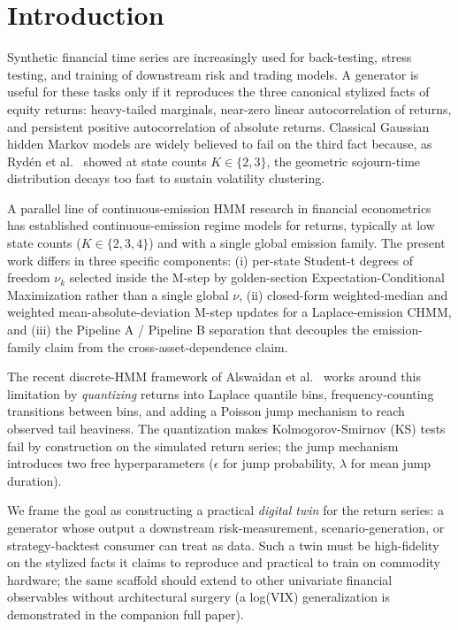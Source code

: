 \documentclass[sigconf,anonymous,nonacm=true]{acmart}
\begin{document}
\section{Introduction}
\label{sec:intro}

Synthetic financial time series are increasingly used for back-testing,
stress testing, and training of downstream risk and trading models. A
generator is useful for these tasks only if it reproduces the three
canonical stylized facts of equity returns: heavy-tailed marginals,
near-zero linear autocorrelation of returns, and persistent positive
autocorrelation of absolute returns. Classical Gaussian hidden Markov
models are widely believed to fail on the third fact because, as
Ryd\'{e}n et al.~\cite{ryden1998stylized} showed at state counts
$K \in \{2, 3\}$, the geometric sojourn-time distribution decays too
fast to sustain volatility clustering.

A parallel line of continuous-emission HMM research in financial
econometrics~\cite{hamilton1989regime, bulla2006stylized,
nystrup2017longmemory} has established continuous-emission regime models
for returns, typically at low state counts ($K \in \{2, 3, 4\}$) and
with a single global emission family. The present work differs in three
specific components: (i) per-state Student-t degrees of freedom
$\nu_k$ selected inside the M-step by golden-section Expectation-Conditional
Maximization rather than a single global $\nu$, (ii) closed-form
weighted-median and weighted mean-absolute-deviation M-step updates for
a Laplace-emission CHMM, and (iii) the Pipeline A / Pipeline B separation
that decouples the emission-family claim from the cross-asset-dependence
claim.

The recent discrete-HMM framework of Alswaidan et
al.~\cite{alswaidan2026hybrid} works around this limitation by
\emph{quantizing} returns into Laplace quantile bins, frequency-counting
transitions between bins, and adding a Poisson jump mechanism to
reach observed tail heaviness. The quantization makes Kolmogorov-Smirnov
(KS) tests fail by construction on the simulated return series; the
jump mechanism introduces two free hyperparameters ($\epsilon$ for
jump probability, $\lambda$ for mean jump duration).

We frame the goal as constructing a practical \emph{digital twin} for
the return series: a generator whose output a downstream
risk-measurement, scenario-generation, or strategy-backtest consumer
can treat as data. Such a twin must be high-fidelity on the stylized
facts it claims to reproduce and practical to train on commodity
hardware; the same scaffold should extend to other univariate
financial observables without architectural surgery (a log(VIX)
generalization is demonstrated in the companion full paper).
\end{document}
